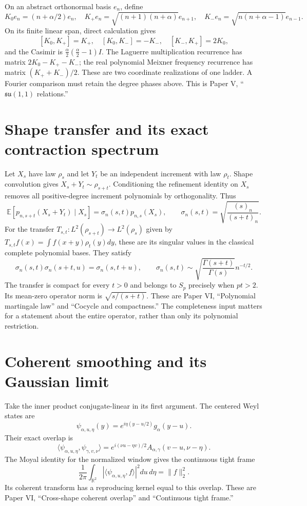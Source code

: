 On an abstract orthonormal basis $e_n$, define
\[
 K_0e_n=(n+\alpha/2)e_n,\quad
 K_+e_n=\sqrt{(n+1)(n+\alpha)}e_{n+1},\quad
 K_-e_n=\sqrt{n(n+\alpha-1)}e_{n-1}.
\]
On its finite linear span, direct calculation gives
\[
 [K_0,K_+]=K_+,\quad [K_0,K_-]=-K_-,\quad
 [K_-,K_+]=2K_0,
\]
and the Casimir is $\frac\alpha2(\frac\alpha2-1)I$.
The Laguerre multiplication recurrence has matrix
$2K_0-K_+-K_-$; the real polynomial Meixner frequency recurrence has matrix
$(K_++K_-)/2$. These are two coordinate realizations of one ladder. A Fourier
comparison must retain the degree phases above. This is Paper V,
``$\mathfrak{su}(1,1)$ relations.''

\section{Shape transfer and its exact contraction spectrum}

Let $X_s$ have law $\rho_s$ and let $Y_t$ be an independent increment with law
$\rho_t$. Shape convolution gives $X_s+Y_t\sim\rho_{s+t}$. Conditioning the
refinement identity on $X_s$ removes all positive-degree increment polynomials
by orthogonality. Thus
\[
 \mathbb E[p_{n,s+t}(X_s+Y_t)\mid X_s]
 =\sigma_n(s,t)p_{n,s}(X_s),\qquad
 \sigma_n(s,t)=\sqrt{\frac{(s)_n}{(s+t)_n}}.
\]
For the transfer
$T_{s,t}:L^2(\rho_{s+t})\to L^2(\rho_s)$ given by
$T_{s,t}f(x)=\int f(x+y)\rho_t(y)dy$, these are its singular values in the
classical complete polynomial bases. They satisfy
\[
 \sigma_n(s,t)\sigma_n(s+t,u)=\sigma_n(s,t+u),\qquad
 \sigma_n(s,t)\sim
 \sqrt{\frac{\Gamma(s+t)}{\Gamma(s)}}n^{-t/2}.
\]
The transfer is compact for every $t>0$ and belongs to $S_p$ precisely when
$pt>2$. Its mean-zero operator norm is $\sqrt{s/(s+t)}$. These are Paper VI,
``Polynomial martingale law'' and ``Cocycle and compactness.'' The completeness
input matters for a statement about the entire operator, rather than only its
polynomial restriction.

\section{Coherent smoothing and its Gaussian limit}

Take the inner product conjugate-linear in its first argument. The centered
Weyl states are
\[
 \psi_{\alpha,u,\eta}(y)=e^{i\eta(y-u/2)}g_\alpha(y-u).
\]
Their exact overlap is
\[
 \langle\psi_{\alpha,u,\eta},\psi_{\gamma,v,\nu}\rangle
 =e^{i(\nu u-\eta v)/2}A_{\alpha,\gamma}(v-u,\nu-\eta).
\]
The Moyal identity for the normalized window gives the continuous tight frame
\[
 \frac1{2\pi}\int_{\mathbb R^2}
 |\langle\psi_{\alpha,u,\eta},f\rangle|^2du\,d\eta=\|f\|_2^2.
\]
Its coherent transform has a reproducing kernel equal to this overlap.
These are Paper VI, ``Cross-shape coherent overlap'' and ``Continuous tight
frame.''


